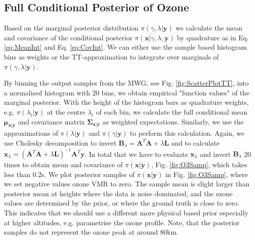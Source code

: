 \subsection{Full Conditional Posterior of Ozone}
\label{subsec:firstCond}
Based on the marginal posterior distribution $\pi(\gamma, \lambda | \bm{y})$ we calculate the mean and covariance of the conditional posterior $\pi(\bm{x} | \gamma, \lambda, \bm{y})$ by quadrature as in Eq. \ref{eq:MeanInt} and Eq. \ref{eq:CovInt}.
We can either use the sample based histogram bins as weights or the TT-approximation to integrate over marginals of $\pi(\gamma, \lambda | \bm{y})$.

By binning the output samples from the MWG, see Fig. \ref{fig:ScatterPlotTT}, into a normalised histogram with 20 bins, we obtain empirical "function values" of the marginal posterior.
With the height of the histogram bars as quadrature weights, e.g. $\pi(\lambda_i| \bm{y})$ at the centre $\lambda_i$ of each bin, we calculate the full conditional mean $\bm{\mu}_{\bm{x}|\bm{y}}$ and covariance matrix $\bm{\Sigma}_{\bm{x}|\bm{y}}$ as weighted expectations.
Similarly, we use the approximations of $\pi(\lambda| \bm{y})$ and $\pi( \gamma | \bm{y})$ to perform this calculation.
Again, we use Cholesky decomposition to invert $\bm{B}_{\lambda} = \bm{A}^T \bm{A} + \lambda \bm{L}$ and to calculate $\bm{x}_{\lambda} = (\bm{A}^T \bm{A} + \lambda \bm{L} )^{-1} \bm{A}^T \bm{y}$.
In total that we have to evaluate $\bm{x}_{\lambda}$ and invert $\bm{B}_{\lambda}$ 20 times to obtain mean and covariance of $\pi(\bm{x}|\bm{y})$, Fig. \ref{fig:O3Samp}, which takes less than $0.2$s.
We plot posterior samples of $\pi(\bm{x}|\bm{y})$ in Fig. \ref{fig:O3Samp}, where we set negative values ozone VMR to zero.
The sample mean is slight larger than posterior mean at heights where the data is noise dominated, and the ozone values are determined by the prior, or where the ground truth is close to zero.
This indicates that we should use a different more physical based prior especially at higher altitudes, e.g. parametrise the ozone profile.
Note, that the posterior samples do not represent the ozone peak at around $80$km.
